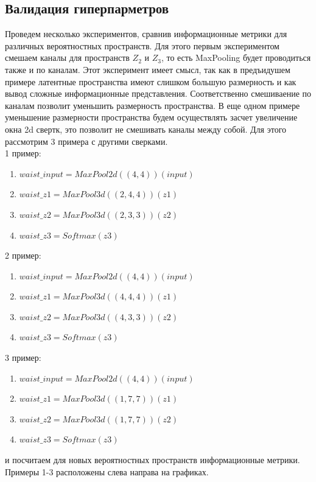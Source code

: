 \subsection{Валидация гиперпарметров}
Проведем несколько экспериментов, сравнив информационные метрики для различных вероятностных пространств. Для этого первым экспериментом смешаем каналы для пространств $Z_2$ и $Z_3$, то есть MaxPooling будет проводиться также и по каналам. Этот эксперимент имеет смысл, так как в предъидушем примере латентные пространства имеют слишком большую размерность и как вывод сложные информационные представления. Соответственно смешиваение по каналам позволит уменьшить размерность пространства. В еще одном примере уменьшение размерности пространства будем осуществлять засчет увеличение окна 2d свертк, это позволит не смешивать каналы между собой. Для этого рассмотрим 3 примера с другими сверками. \\
1 пример:
\begin{enumerate}
\item $waist\_input = MaxPool2d((4, 4))(input)$
\item $waist\_z1 = MaxPool3d((2, 4, 4))(z1)$
\item $waist\_z2 = MaxPool3d((2, 3, 3))(z2)$
\item $waist\_z3 = Softmax(z3)$
\end{enumerate}
2 пример:
\begin{enumerate}
\item $waist\_input = MaxPool2d((4, 4))(input)$
\item $waist\_z1 = MaxPool3d((4, 4, 4))(z1)$
\item $waist\_z2 = MaxPool3d((4, 3, 3))(z2)$
\item $waist\_z3 = Softmax(z3)$
\end{enumerate}
3 пример:
\begin{enumerate}
\item $waist\_input = MaxPool2d((4, 4))(input)$
\item $waist\_z1 = MaxPool3d((1, 7, 7))(z1)$
\item $waist\_z2 = MaxPool3d((1, 7, 7))(z2)$
\item $waist\_z3 = Softmax(z3)$
\end{enumerate}
и посчитаем для новых вероятностных пространств информационные метрики.
Примеры 1-3 расположены слева направа на графиках.
